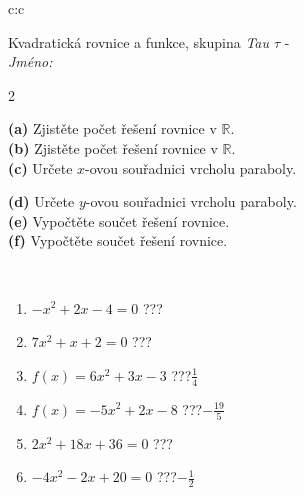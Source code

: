 \documentclass[10pt]{report}
\begin{document}
\begin{tabular}{c:c}
\begin{minipage}[c][104.5mm][t]{0.5\linewidth}
\begin{center}
\vspace{7mm}
{\huge \LARGE Kvadratická rovnice a funkce, skupina \textit{Tau $\tau$} -}\\[5mm]
\textit{Jméno:}\phantom{xxxxxxxxxxxxxxxxxxxxxxxxxxxxxxxxxxxxxxxxxxxxxxxxxxxxxxxxxxxxxxxxx}\\[5mm]
\begin{minipage}{0.95\linewidth}
\begin{center}
{\small \begin{multicols}{2} \raggedright
\textbf{(a)} Zjistěte počet řešení rovnice v \(\mathbb{R}\). \\[1mm]
\textbf{(b)} Zjistěte počet řešení rovnice v \(\mathbb{R}\). \\[1mm]
\textbf{(c)} Určete \(x\)-ovou souřadnici vrcholu paraboly. \par \columnbreak
\textbf{(d)} Určete \(y\)-ovou souřadnici vrcholu paraboly. \\[1mm]
\textbf{(e)} Vypočtěte součet řešení rovnice. \\[1mm]
\textbf{(f)} Vypočtěte součet řešení rovnice.
\end{multicols}
}
\end{center}
\end{minipage}
\\[4mm]
\begin{minipage}{0.79\linewidth}
\begin{center}
\begin{varwidth}{\linewidth}
\begin{enumerate}
\Large
\item $-x^2+2x-4=0$\quad \dotfill\; ???\;\dotfill {}
\item $7x^2+x+2=0$\quad \dotfill\; ???\;\dotfill {}
\item $f(x)=6x^2+3x-3$\quad \dotfill\; ???\;\dotfill \quad $\frac{1}{4}$
\item $f(x)=-5x^2+2x-8$\quad \dotfill\; ???\;\dotfill \quad $-\frac{19}{5}$
\item $2x^2+18x+36=0$\quad \dotfill\; ???\;\dotfill {}
\item $-4x^2-2x+20=0$\quad \dotfill\; ???\;\dotfill \quad $-\frac{1}{2}$
\end{enumerate}
\end{varwidth}
\end{center}

\end{minipage}
\end{center}
\end{minipage}
\end{tabular}
\end{document}
